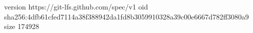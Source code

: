 version https://git-lfs.github.com/spec/v1
oid sha256:4dfb61cfed7114a38f388942da1fd8b3059910328a39c00e6667d782ff3080a9
size 174928
